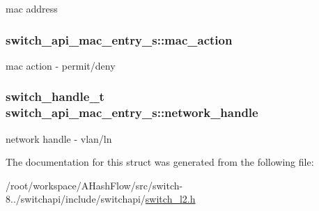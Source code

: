 mac address \hypertarget{structswitch__api__mac__entry__s_ad971697f7c9e97d9cc9c09965aea6121}{
\subsubsection[{mac\+\_\+action}]{ switch\+\_\+api\+\_\+mac\+\_\+entry\+\_\+s\+::mac\+\_\+action}}\label{structswitch__api__mac__entry__s_ad971697f7c9e97d9cc9c09965aea6121}
mac action -\/ permit/deny \hypertarget{structswitch__api__mac__entry__s_aee7d57cd67dadc7cb70f4b1fc2c4a3a2}{
\subsubsection[{network\+\_\+handle}]{\setlength{\rightskip}{0pt plus 5cm}switch\+\_\+handle\+\_\+t switch\+\_\+api\+\_\+mac\+\_\+entry\+\_\+s\+::network\+\_\+handle}}\label{structswitch__api__mac__entry__s_aee7d57cd67dadc7cb70f4b1fc2c4a3a2}
network handle -\/ vlan/ln 

The documentation for this struct was generated from the following file\+:\begin{DoxyCompactItemize}
\item 
/root/workspace/\+A\+Hash\+Flow/src/switch-\/8../switchapi/include/switchapi/\hyperlink{switch__l2_8h}{switch\+\_\+l2.\+h}\end{DoxyCompactItemize}
